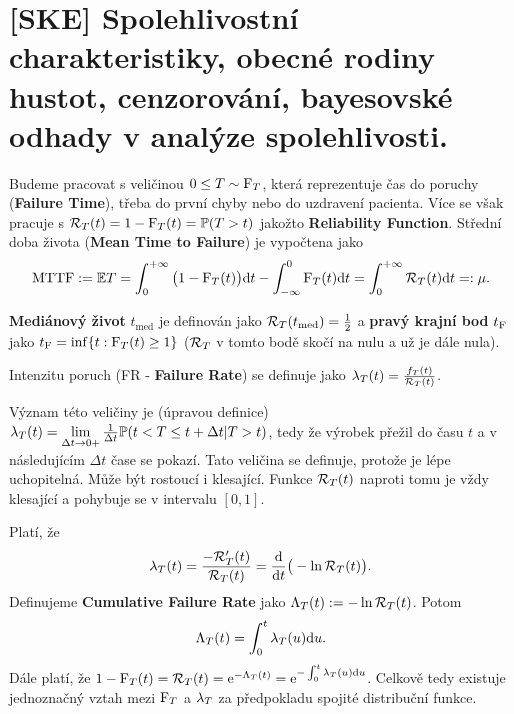 \chapter{[SKE] Spolehlivostní charakteristiky, obecné rodiny hustot, cenzorování, bayesovské odhady v analýze spolehlivosti.}

Budeme pracovat s veličinou  $0\leq T\sim \mathrm{F}_T$, která reprezentuje čas do poruchy (\textbf{Failure Time}), třeba do první chyby nebo do uzdravení pacienta. Více se však pracuje s $\mathcal{R}_T(t)=1-\mathrm{F}_T(t)=\mathbb{P}(T>t)$ jakožto \textbf{Reliability Function}. Střední doba života (\textbf{Mean Time to Failure}) je vypočtena jako $$\mathrm{MTTF}:=\mathbb{E} T=\int_{0}^{+\infty}\big(1-\mathrm{F}_T(t)\big)\mathrm{d} t - \int_{-\infty}^0\mathrm{F}_T(t)\mathrm{d} t = \int_{0}^{+\infty}\mathcal{R}_T(t)\mathrm{d} t=:\mu.$$

\begin{define}
	\textbf{Mediánový život} $t_\mathrm{med}$ je definován jako $\mathcal{R}_T(t_\mathrm{med})=\frac{1}{2}$ a  \textbf{pravý krajní bod} $t_{\mathrm{F}}$ jako  $t_{\mathrm{F}}=\inf\{ t:\mathrm{F}_T(t)\geq1 \}$ ($\mathcal{R}_T$ v tomto bodě skočí na nulu a už je dále nula).
\end{define}

\begin{define}
	Intenzitu poruch (FR - \textbf{Failure Rate}) se definuje jako  $\lambda_T(t)=\frac{f_T(t)}{\mathcal{R}_T(t)}$.
\end{define}

Význam této veličiny je (úpravou definice) $\lambda_T(t)=\lim\limits_{\Delta t\to 0+}\frac{1}{\Delta t}\mathbb{P}(t<T\leq t+\Delta t|T>t)$, tedy že výrobek přežil do času $t$ a v následujícím $\Delta t$ čase se pokazí. Tato veličina se definuje, protože je lépe uchopitelná. Může být rostoucí i klesající. Funkce $\mathcal{R}_T(t)$ naproti tomu je vždy klesající a pohybuje se v intervalu $[0,1]$.

\begin{theorem}[Vztahy] Platí, že
	$$ \lambda_T(t)=\frac{-\mathcal{R}_T'(t)}{\mathcal{R}_T(t)}=\frac{\mathrm{d}}{\mathrm{d} t}\big(-\ln 
	\mathcal{R}_T(t)\big). $$
	Definujeme \textbf{Cumulative Failure Rate} jako $\Lambda_T(t):= -\ln\mathcal{R}_T(t)$. Potom
	$$ \Lambda_T(t) = \int_{0}^{t}\lambda_T(u)\mathrm{d} u. $$
	Dále platí, že 
	$ 1-\mathrm{F}_T(t)=\mathcal{R}_T(t)=\mathrm{e}^{-\Lambda_T(t)} = \mathrm{e}^{-\int_{0}^{t}\lambda_T(u)\mathrm{d} u}$. Celkově tedy existuje jednoznačný vztah mezi $\mathrm{F}_T$ a $\lambda_T$ za předpokladu spojité distribuční funkce.
\end{theorem}

